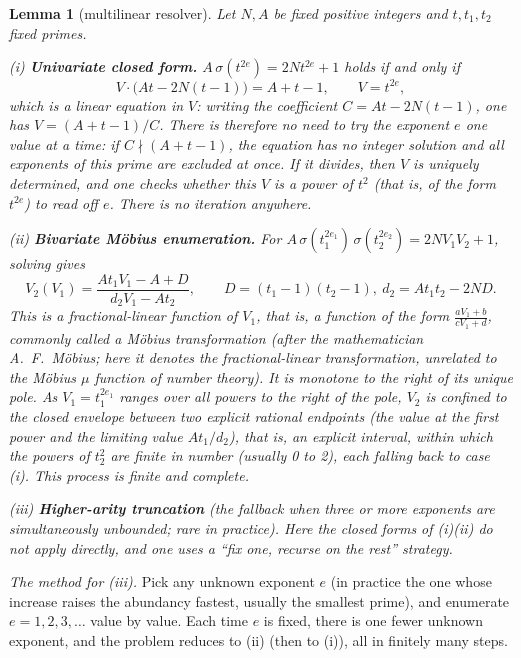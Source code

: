 \documentclass[11pt]{article}
\newtheorem{lemma}{Lemma}
\theoremstyle{remark}
\begin{document}
\begin{lemma}[multilinear resolver]\label{lem:resolver} Let $N, A$ be fixed positive integers and $t, t_1, t_2$ fixed primes.

\textup{(i)} \textbf{Univariate closed form.} $A\,\sigma(t^{2e}) = 2Nt^{2e} + 1$ holds if and only if
\[ V \cdot \bigl(At - 2N(t - 1)\bigr) = A + t - 1, \qquad V = t^{2e},
\] which is a linear equation in $V$: writing the coefficient $C = At - 2N(t-1)$, one has $V = (A + t - 1)/C$. There is therefore no need to try the exponent $e$ one value at a time: if $C \nmid (A + t - 1)$, the equation has no integer solution and all exponents of this prime are excluded at once. If it divides, then $V$ is uniquely determined, and one checks whether this $V$ is a power of $t^2$ (that is, of the form $t^{2e}$) to read off $e$. There is no iteration anywhere.

\textup{(ii)} \textbf{Bivariate M\"obius enumeration.} For $A\,\sigma(t_1^{2e_1})\,\sigma(t_2^{2e_2}) = 2NV_1V_2 + 1$, solving gives
\[ V_2(V_1) = \frac{At_1V_1 - A + D}{d_2V_1 - At_2}, \qquad D = (t_1 - 1)(t_2 - 1),\ d_2 = At_1t_2 - 2ND.
\] This is a fractional-linear function of $V_1$, that is, a function of the form $\frac{aV_1 + b}{cV_1 + d}$, commonly called a M\"obius transformation (after the mathematician A.~F.~M\"obius; here it denotes the fractional-linear transformation, unrelated to the M\"obius $\mu$ function of number theory). It is monotone to the right of its unique pole. As $V_1 = t_1^{2e_1}$ ranges over all powers to the right of the pole, $V_2$ is confined to the closed envelope between two explicit rational endpoints (the value at the first power and the limiting value $At_1/d_2$), that is, an explicit interval, within which the powers of $t_2^2$ are finite in number (usually 0 to 2), each falling back to case \textup{(i)}. This process is finite and complete.

\textup{(iii)} \textbf{Higher-arity truncation} (the fallback when three or more exponents are simultaneously unbounded; rare in practice). Here the closed forms of \textup{(i)(ii)} do not apply directly, and one uses a ``fix one, recurse on the rest'' strategy.
\end{lemma}

\emph{The method for \textup{(iii)}.} Pick any unknown exponent $e$ (in practice the one whose increase raises the abundancy fastest, usually the smallest prime), and enumerate $e = 1, 2, 3, \dots$ value by value. Each time $e$ is fixed, there is one fewer unknown exponent, and the problem reduces to (ii) (then to (i)), all in finitely many steps.
\end{document}
